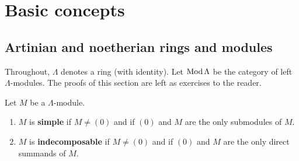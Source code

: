 %





\chapter{Basic concepts}



\section{Artinian and noetherian rings and modules}


Throughout, $\Lambda$ denotes a ring (with identity). Let $\operatorname{Mod} \Lambda$ be the category of left $\Lambda$-modules. The proofs of this section are left as exercises to the reader.


\begin{definition}
Let $M$ be a $\Lambda$-module.
\begin{enumerate}
\item $M$ is \textbf{simple} if $M\neq (0)$ and if $(0)$ and $M$ are the only submodules of $M$.
\item $M$ is \textbf{indecomposable} if $M\neq (0)$ and if $(0)$ and $M$ are the only direct summands of $M$.
\end{enumerate}
\end{definition}


